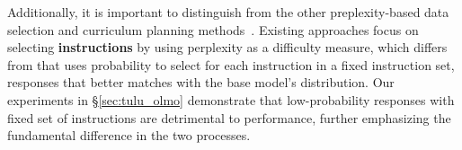 Additionally, it is important to distinguish \name from the other preplexity-based data selection and curriculum planning methods~\cite{wu2024curriculumlearningqualitydrivendata,li2024superfilteringweaktostrongdatafiltering,liu2024letslearnstepstep}. Existing approaches focus on selecting \textbf{instructions} by using perplexity as a difficulty measure, which differs from \name that uses probability to select for each instruction in a fixed instruction set, responses that better matches with the base model's distribution. Our experiments in \S\ref{sec:tulu_olmo} demonstrate that low-probability responses with fixed set of instructions are detrimental to performance, further emphasizing the fundamental difference in the two processes. 



